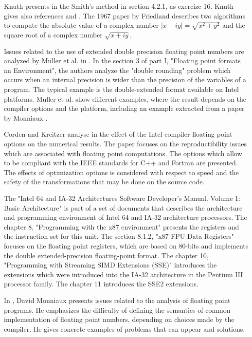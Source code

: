 Knuth presents in \cite{artcomputerKnuthVol2}
the Smith's method in section 4.2.1, as exercize 16. Knuth gives also 
references \cite{Wynn:1962:AAP} and \cite{DBLP:journals/cacm/Friedland67}.
The 1967 paper by Friedland \cite{DBLP:journals/cacm/Friedland67} describes 
two algorithms to compute the absolute value of a complex number 
$|x+iy| = \sqrt{x^2+y^2}$ and the square root of a 
complex number $\sqrt{x+iy}$.

Issues related to the use of extended double precision floating point 
numbers are analyzed by Muller et al. in \cite{MullerEtAl2010}. 
In the section 3 of part I, "Floating point formats an Environment", 
the authors analyze the "double rounding" problem which occurs when an 
internal precision is wider than the precision of the variables of a 
program. The typical example is the double-extended format available 
on Intel platforms. Muller et al. show different examples, where the 
result depends on the compiler options and the platform, including an example extracted 
from a paper by Monniaux \cite{Monniaux2008}.

Corden and Kreitzer analyse in \cite{CordenKreitzerIntel2009} the 
effect of the Intel compiler floating point options on the numerical results.
The paper focuses on the reproductibility issues which are associated 
with floating point computations. The options which allow to be compliant 
with the IEEE standards for C++ and Fortran are presented.
The effects of optimization options is considered with respect to 
speed and the safety of the transformations that may be done on the 
source code.

The "Intel 64 and IA-32 Architectures Software Developer's Manual. Volume 1: Basic Architecture" 
\cite{Intel64IA32Architecture} is part of a set of documents that describes the architecture
and programming environment of Intel 64 and IA-32 architecture processors. The chapter 8, "Programming 
with the x87 environment" presents the registers and the 
instruction set for this unit. The section 8.1.2, "x87 FPU Data Registers" focuses 
on the floating point registers, which are based on 80-bits and implements 
the double extended-precision floating-point format. 
The chapter 10, "Programming with Streaming SIMD Extensions (SSE)" introduces the 
extensions which were introduced into the IA-32 architecture in
the Pentium III processor family. The chapter 11 introduces the SSE2 extensions.

In \cite{Monniaux2008}, David Monniaux presents issues related to the 
analysis of floating point programs. He emphasizes the difficulty
of defining the semantics of common implementation of floating point numbers,
depending on choices made by the compiler. He gives concrete examples of problems that 
can appear and solutions.


